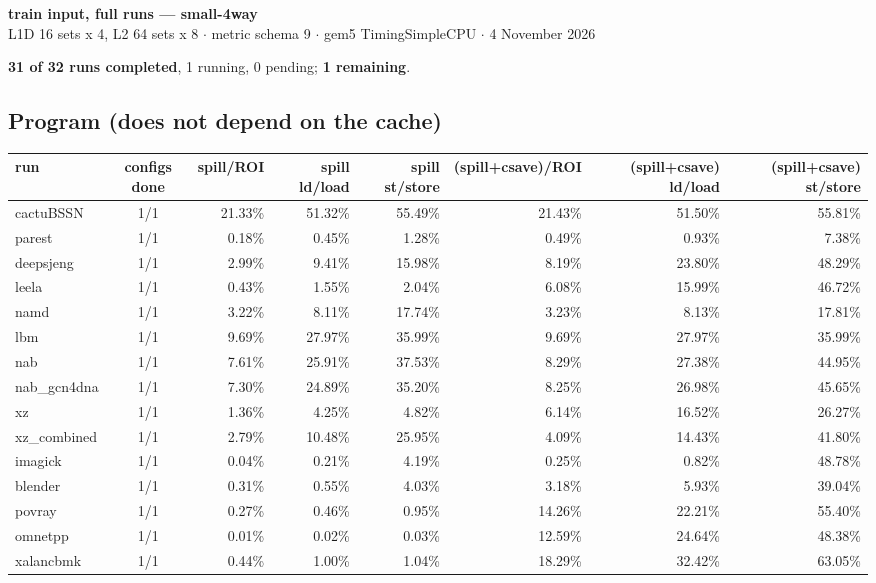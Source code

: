 \documentclass[10pt,a4paper,landscape]{article}
\begin{document}
\begin{center}
{\large\bfseries train input, full runs --- small-4way}\\[3pt]
{\small L1D 16 sets x 4, L2 64 sets x 8 $\cdot$ metric schema 9 $\cdot$ gem5 TimingSimpleCPU $\cdot$ 4 November 2026}
\end{center}
\textbf{31 of 32 runs completed}, 1 running, 0 pending; \textbf{1 remaining}.\par
\subsection*{Program (does not depend on the cache)}
{\footnotesize
\begin{longtable}{lcrrrrrr}
\toprule
run & configs done & spill/ROI & spill ld/load & spill st/store & (spill+csave)/ROI & (spill+csave) ld/load & (spill+csave) st/store \\
\midrule
\endhead
\bottomrule
\endfoot
cactuBSSN & 1/1 & 21.33\% & 51.32\% & 55.49\% & 21.43\% & 51.50\% & 55.81\% \\
parest & 1/1 & 0.18\% & 0.45\% & 1.28\% & 0.49\% & 0.93\% & 7.38\% \\
deepsjeng & 1/1 & 2.99\% & 9.41\% & 15.98\% & 8.19\% & 23.80\% & 48.29\% \\
leela & 1/1 & 0.43\% & 1.55\% & 2.04\% & 6.08\% & 15.99\% & 46.72\% \\
namd & 1/1 & 3.22\% & 8.11\% & 17.74\% & 3.23\% & 8.13\% & 17.81\% \\
lbm & 1/1 & 9.69\% & 27.97\% & 35.99\% & 9.69\% & 27.97\% & 35.99\% \\
nab & 1/1 & 7.61\% & 25.91\% & 37.53\% & 8.29\% & 27.38\% & 44.95\% \\
nab\_gcn4dna & 1/1 & 7.30\% & 24.89\% & 35.20\% & 8.25\% & 26.98\% & 45.65\% \\
xz & 1/1 & 1.36\% & 4.25\% & 4.82\% & 6.14\% & 16.52\% & 26.27\% \\
xz\_combined & 1/1 & 2.79\% & 10.48\% & 25.95\% & 4.09\% & 14.43\% & 41.80\% \\
imagick & 1/1 & 0.04\% & 0.21\% & 4.19\% & 0.25\% & 0.82\% & 48.78\% \\
blender & 1/1 & 0.31\% & 0.55\% & 4.03\% & 3.18\% & 5.93\% & 39.04\% \\
povray & 1/1 & 0.27\% & 0.46\% & 0.95\% & 14.26\% & 22.21\% & 55.40\% \\
omnetpp & 1/1 & 0.01\% & 0.02\% & 0.03\% & 12.59\% & 24.64\% & 48.38\% \\
xalancbmk & 1/1 & 0.44\% & 1.00\% & 1.04\% & 18.29\% & 32.42\% & 63.05\% \\

\end{longtable}}
\end{document}
